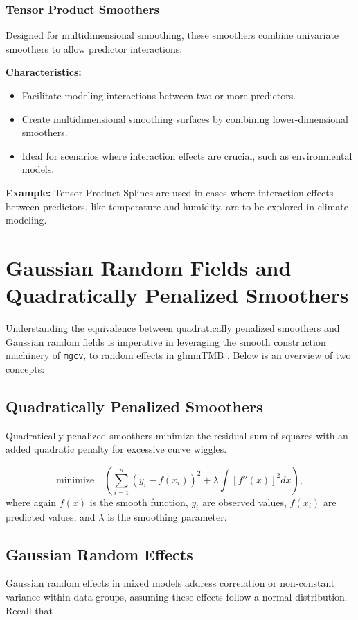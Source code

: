 \documentclass[12pt, twoside,hidelinks]{article}
\theoremstyle{definition}
\numberwithin{equation}{section}
\begin{document}
\subsubsection{Tensor Product Smoothers}
Designed for multidimensional smoothing, these smoothers combine univariate smoothers to allow predictor interactions.

\textbf{Characteristics:}
\begin{itemize}
    \item Facilitate modeling interactions between two or more predictors.
    \item Create multidimensional smoothing surfaces by combining lower-dimensional smoothers.
    \item Ideal for scenarios where interaction effects are crucial, such as environmental models.
\end{itemize}

\textbf{Example:} Tensor Product Splines are used in cases where interaction effects between predictors, like temperature and humidity, are to be explored in climate modeling.

\section{Gaussian Random Fields and Quadratically Penalized Smoothers}

Understanding the equivalence between quadratically penalized smoothers and Gaussian random fields is imperative in leveraging the smooth construction machinery of \texttt{mgcv}, to random effects in glmmTMB \cite{wood2017}. Below is an overview of two concepts:

\subsection{Quadratically Penalized Smoothers}
Quadratically penalized smoothers minimize the residual sum of squares with an added quadratic penalty for excessive curve wiggles.

\begin{equation}
    \text{minimize} \quad \left( \sum_{i=1}^{n} (y_i - f(x_i))^2 + \lambda \int [f''(x)]^2 dx \right),
    \label{eq:quadratic_penalty}
\end{equation}
where again \( f(x) \) is the smooth function, \( y_i \) are observed values, \( f(x_i) \) are predicted values, and \( \lambda \) is the smoothing parameter.

\subsection{Gaussian Random Effects}
Gaussian random effects in mixed models address correlation or non-constant variance within data groups, assuming these effects follow a normal distribution. Recall that
\end{document}

